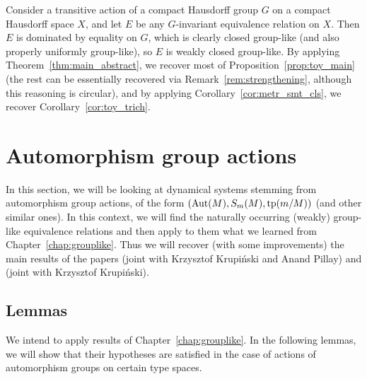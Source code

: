 	\begin{ex}
		Consider a transitive action of a compact Hausdorff group $G$ on a compact Hausdorff space $X$, and let $E$ be any $G$-invariant equivalence relation on $X$. Then $E$ is dominated by equality on $G$, which is clearly closed group-like (and also properly uniformly group-like), so $E$ is weakly closed group-like. By applying Theorem~\ref{thm:main_abstract}, we recover most of Proposition~\ref{prop:toy_main} (the rest can be essentially recovered via Remark~\ref{rem:strengthening}, although this reasoning is circular), and by applying Corollary~\ref{cor:metr_smt_cls}, we recover Corollary~\ref{cor:toy_trich}.
		\xqed{\lozenge}
	\end{ex}
	
	\section{Automorphism group actions}
	In this section, we will be looking at dynamical systems stemming from automorphism group actions, of the form $(\operatorname{{Aut}}(M),S_m(M),\operatorname{{tp}}(m/M))$ (and other similar ones). In this context, we will find the naturally occurring (weakly) group-like equivalence relations and then apply to them what we learned from Chapter~\ref{chap:grouplike}. Thus we will recover (with some improvements) the main results of the papers \cite{KPR15} (joint with Krzysztof Krupiński and Anand Pillay) and \cite{KR18} (joint with Krzysztof Krupiński).
	
	\subsection*{Lemmas}
	We intend to apply results of Chapter~\ref{chap:grouplike}. In the following lemmas, we will show that their hypotheses are satisfied in the case of actions of automorphism groups on certain type spaces.
	
